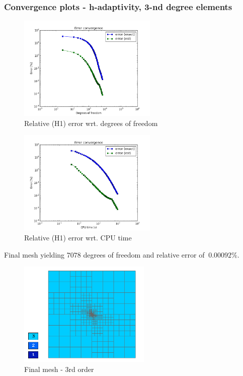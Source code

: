 		\subsubsection{Convergence plots - h-adaptivity, 3-nd degree elements}
			\begin{figure}[H]
				\centering
				\includegraphics[height=5cm]{img/kellog-h3-dof.png}
				\caption{Relative (H1) error wrt. degrees of freedom}
			\end{figure}
			
			\begin{figure}[H]
				\centering
				\includegraphics[height=5cm]{img/kellog-h3-cpu.png}
				\caption{Relative (H1) error wrt. CPU time}
			\end{figure}
			
			
			Final mesh yielding $7078$ degrees of freedom and relative error of $~0.00092\%$.
			\begin{figure}[H]
				\centering
				\includegraphics[height=5cm]{img/kellog-h3-finalmesh.png}
				\caption{Final mesh - 3rd order}
			\end{figure}
			
